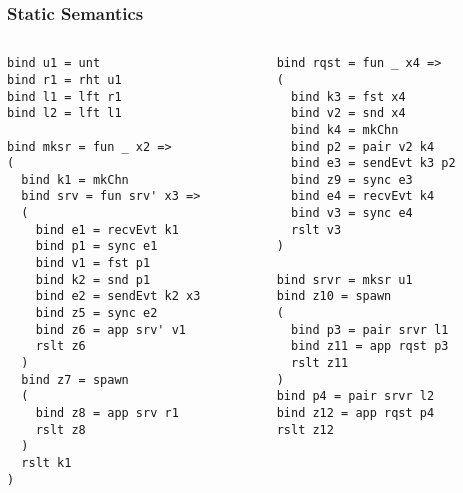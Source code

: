 \documentclass{beamer}
\begin{document}
\begin{frame}[fragile]
	\frametitle{Static Semantics}
\begin{columns}
\begin{column}{0.5\textwidth}
\begin{lstlisting}[language=normal_lang, mathescape]
bind u1 = unt
bind r1 = rht u1
bind l1 = lft r1
bind l2 = lft l1

bind mksr = fun _ x2 => 
(
  bind k1 = mkChn
  bind srv = fun srv' x3 =>
  (
    bind e1 = recvEvt k1
    bind p1 = sync e1
    bind v1 = fst p1
    bind k2 = snd p1 
    bind e2 = sendEvt k2 x3
    bind z5 = sync e2
    bind z6 = app srv' v1
    rslt z6 
  )
  bind z7 = spawn
  (
    bind z8 = app srv r1
    rslt z8 
  )
  rslt k1
)
\end{lstlisting}
\end{column}

\begin{column}{0.5\textwidth}
\begin{lstlisting}[language=normal_lang, mathescape]
bind rqst = fun _ x4 =>
(
  bind k3 = fst x4
  bind v2 = snd x4
  bind k4 = mkChn
  bind p2 = pair v2 k4
  bind e3 = sendEvt k3 p2
  bind z9 = sync e3
  bind e4 = recvEvt k4
  bind v3 = sync e4
  rslt v3
)

bind srvr = mksr u1
bind z10 = spawn
( 
  bind p3 = pair srvr l1
  bind z11 = app rqst p3
  rslt z11
)
bind p4 = pair srvr l2
bind z12 = app rqst p4
rslt z12
\end{lstlisting}
\end{column}
\end{columns}
\end{frame}
\end{document}
